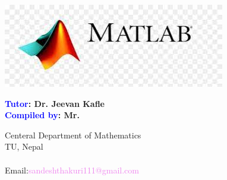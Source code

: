 \vspace{2cm}

\begin{center}

  {\bfseries { \LARGE
      \vspace{2cm}


      {\thetitle}}

    \vspace{1cm}

    {\large{\color{red!90}{For PDEs: Heat Equation, Advection-Diffiusion Equation,...}}}}

    \vspace{2cm}

    \includegraphics[scale=0.9]{logo.jpg}
  \end{center}


  \vspace{2.5cm}

  {\large \bfseries
    \hspace{1cm} \textcolor{blue}{Tutor}: \hspace{8mm} Dr. Jeevan Kafle\\
    \hspace{1cm} \textcolor{blue}{Compiled by}: \hspace{5mm} Mr. \theauthor}



  \vspace{2.5cm}

  \begin{center}
    Centeral Department of Mathematics\\
    TU, \; Nepal\\
    \thedate\\[3mm]

    Email:\;\;\textcolor{violet}{sandeshthakuri111@gmail.com}
\end{center}
\thispagestyle{empty}
\clearpage